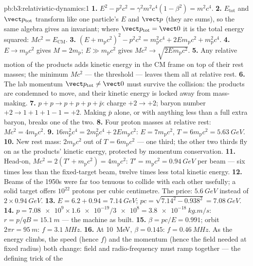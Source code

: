 \begin{solution}{pb:b3:relativistic-dynamics:1}
\textbf{1.} $E^2 - p^2c^2 = \gamma^2m^2c^4(1 - \beta^2) = m^2c^4$.
\textbf{2.} $E_{\text{tot}}$ and $\vect p_{\text{tot}}$ transform
like one particle's $E$ and $\vect p$ (they are sums), so the same
algebra gives an invariant; where $\vect p_{\text{tot}} = \vect 0$ it
is the total energy squared: $Mc^2 = E_{\text{CM}}$.
\textbf{3.} $(E + m_{\text{p}}c^2)^2 - p^2c^2 = m_{\text{p}}^2c^4 +
2Em_{\text{p}}c^2 + m_{\text{p}}^2c^4$.
\textbf{4.} $E \to m_{\text{p}}c^2$ gives $M = 2m_{\text{p}}$;
$E \gg m_{\text{p}}c^2$ gives $Mc^2 \to \sqrt{2Em_{\text{p}}c^2}$.
\textbf{5.} Any relative motion of the products adds kinetic energy
in the CM frame on top of their rest masses; the minimum $Mc^2$ ---
the threshold --- leaves them all at relative rest.
\textbf{6.} The lab momentum $\vect p_{\text{tot}} \neq \vect 0$ must
survive the collision: the products are condemned to move, and their
kinetic energy is locked away from mass-making.
\textbf{7.} $p + p \to p + p + p + \bar p$: charge $+2 \to +2$;
baryon number $+2 \to 1 + 1 + 1 - 1 = +2$. Making $\bar p$ alone, or
with anything less than a full extra baryon, breaks one of the two.
\textbf{8.} Four proton masses at relative rest: $Mc^2 =
4m_{\text{p}}c^2$.
\textbf{9.} $16m_{\text{p}}^2c^4 = 2m_{\text{p}}^2c^4 +
2Em_{\text{p}}c^2$: $E = 7m_{\text{p}}c^2$, $T = 6m_{\text{p}}c^2 =
\qty{5.63}{GeV}$.
\textbf{10.} New rest mass: $2m_{\text{p}}c^2$ out of $T =
6m_{\text{p}}c^2$ --- one third; the other two thirds fly on as the
products' kinetic energy, protected by momentum conservation.
\textbf{11.} Head-on, $Mc^2 = 2(T' + m_{\text{p}}c^2) =
4m_{\text{p}}c^2$: $T' = m_{\text{p}}c^2 = \qty{0.94}{GeV}$ per beam
--- six times less than the fixed-target beam, twelve times less
total kinetic energy.
\textbf{12.} Beams of the 1950s were far too tenuous to collide with
each other usefully; a solid target offers $10^{22}$ protons per
cubic centimetre. The price: $\qty{5.6}{GeV}$ instead of
$2 \times \qty{0.94}{GeV}$.
\textbf{13.} $E = 6.2 + 0.94 = \qty{7.14}{GeV}$; $pc =
\sqrt{7.14^2 - 0.938^2} = \qty{7.08}{GeV}$.
\textbf{14.} $p = \num{7.08e9} \times \num{1.6e-19}/\num{3e8} =
\qty{3.8e-18}{kg.m/s}$: $r = p/qB = \qty{15.1}{m}$ --- the machine as
built.
\textbf{15.} $\beta = pc/E = 0.991$; orbit $2\pi r = \qty{95}{m}$:
$f = \qty{3.1}{MHz}$.
\textbf{16.} At \qty{10}{MeV}, $\beta = 0.145$: $f =
\qty{0.46}{MHz}$. As the energy climbs, the speed (hence $f$) and the
momentum (hence the field needed at fixed radius) both change: field
and radio-frequency must ramp together --- the defining trick of the

\end{solution}
